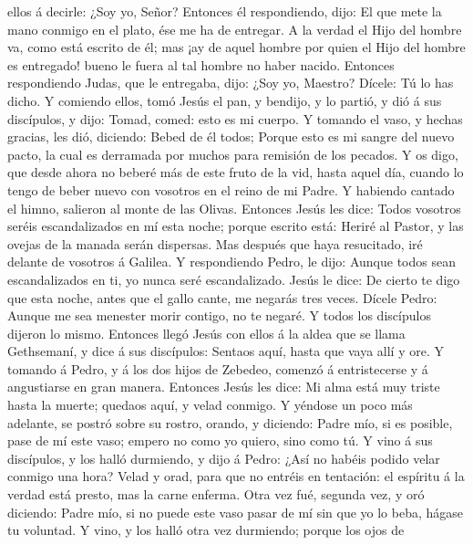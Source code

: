 ellos á decirle: ¿Soy yo, Señor?  Entonces él respondiendo,
dijo: El que mete la mano conmigo en el plato, ése me ha de entregar.
 A la verdad el Hijo del hombre va, como está escrito de
él; mas ¡ay de aquel hombre por quien el Hijo del hombre es entregado!
bueno le fuera al tal hombre no haber nacido.  Entonces
respondiendo Judas, que le entregaba, dijo: ¿Soy yo, Maestro? Dícele: Tú
lo has dicho.  Y comiendo ellos, tomó Jesús el pan, y
bendijo, y lo partió, y dió á sus discípulos, y dijo: Tomad, comed: esto
es mi cuerpo.  Y tomando el vaso, y hechas gracias, les
dió, diciendo: Bebed de él todos;  Porque esto es mi sangre
del nuevo pacto, la cual es derramada por muchos para remisión de los
pecados.  Y os digo, que desde ahora no beberé más de este
fruto de la vid, hasta aquel día, cuando lo tengo de beber nuevo con
vosotros en el reino de mi Padre.  Y habiendo cantado el
himno, salieron al monte de las Olivas.  Entonces Jesús les
dice: Todos vosotros seréis escandalizados en mí esta noche; porque
escrito está: Heriré al Pastor, y las ovejas de la manada serán
dispersas.  Mas después que haya resucitado, iré delante de
vosotros á Galilea.  Y respondiendo Pedro, le dijo: Aunque
todos sean escandalizados en ti, yo nunca seré escandalizado.
 Jesús le dice: De cierto te digo que esta noche, antes que
el gallo cante, me negarás tres veces.  Dícele Pedro:
Aunque me sea menester morir contigo, no te negaré. Y todos los
discípulos dijeron lo mismo.  Entonces llegó Jesús con
ellos á la aldea que se llama Gethsemaní, y dice á sus discípulos:
Sentaos aquí, hasta que vaya allí y ore.  Y tomando á
Pedro, y á los dos hijos de Zebedeo, comenzó á entristecerse y á
angustiarse en gran manera.  Entonces Jesús les dice: Mi
alma está muy triste hasta la muerte; quedaos aquí, y velad conmigo.
 Y yéndose un poco más adelante, se postró sobre su rostro,
orando, y diciendo: Padre mío, si es posible, pase de mí este vaso;
empero no como yo quiero, sino como tú.  Y vino á sus
discípulos, y los halló durmiendo, y dijo á Pedro: ¿Así no habéis podido
velar conmigo una hora?  Velad y orad, para que no entréis
en tentación: el espíritu á la verdad está presto, mas la carne enferma.
 Otra vez fué, segunda vez, y oró diciendo: Padre mío, si
no puede este vaso pasar de mí sin que yo lo beba, hágase tu voluntad.
 Y vino, y los halló otra vez durmiendo; porque los ojos de
